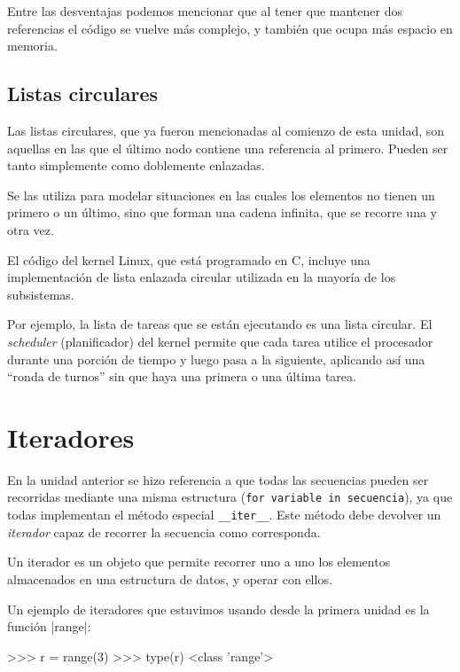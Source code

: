 Entre las desventajas podemos mencionar que al tener que mantener dos
referencias el código se vuelve más complejo, y también que ocupa más
espacio en memoria.

\subsection*{Listas circulares}

Las listas circulares, que ya fueron mencionadas al comienzo de esta
unidad, son aquellas en las que el último nodo contiene una referencia al
primero.  Pueden ser tanto simplemente como doblemente enlazadas.

Se las utiliza para modelar situaciones en las cuales los elementos no
tienen un primero o un último, sino que forman una cadena infinita, que se
recorre una y otra vez.

\begin{sabias_que}
El código del kernel Linux, que está programado en C, incluye una
implementación de lista enlazada circular utilizada en la mayoría de los
subsistemas.

Por ejemplo, la lista de tareas que se están ejecutando es una lista
circular.  El \emph{scheduler} (planificador) del kernel permite que cada tarea
utilice el procesador durante una porción de tiempo y luego pasa a la
siguiente, aplicando así una ``ronda de turnos'' sin que haya una primera o una
última tarea.
\end{sabias_que}

\section{Iteradores}

En la unidad anterior se hizo referencia a que todas las secuencias
pueden ser recorridas mediante una misma estructura
(\lstinline!for variable in secuencia!), ya que todas implementan el método
especial \lstinline!__iter__!.  Este método debe devolver un \emph{iterador}
capaz de recorrer la secuencia como corresponda.

\begin{observacion}
Un iterador es un objeto que permite recorrer uno a uno los elementos
almacenados en una estructura de datos, y operar con ellos.
\end{observacion}

Un ejemplo de iteradores que estuvimos usando desde la primera unidad es la
función |range|:

\begin{codigo-python-sn}
>>> r = range(3)
>>> type(r)
<class 'range'>
\end{codigo-python-sn}


